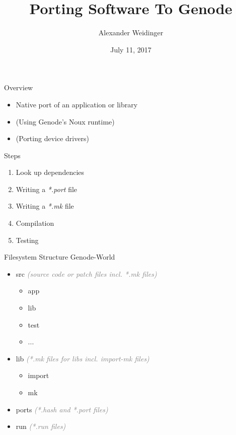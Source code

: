 \documentclass{beamer}
\title{Porting Software To Genode}
\date{July 11, 2017}
\author{Alexander Weidinger}
\institute{Technische Universität München}
\begin{document}
  \maketitle

  \begin{frame}{Overview}
    \begin{itemize}
      \item Native port of an application or library
      \item (Using Genode's Noux runtime)
      \item (Porting device drivers)
    \end{itemize}
  \end{frame}

  \begin{frame}{Steps}
    \begin{enumerate}
      \item Look up dependencies
      \item Writing a \textit{*.port} file
      \item Writing a \textit{*.mk} file
      \item Compilation
      \item Testing
    \end{enumerate}
  \end{frame}

  \begin{frame}{Filesystem Structure Genode-World}
    \begin{itemize}
      \item src \textcolor{gray}{\textit{(source code or patch files incl. *.mk files)}}
      \begin{itemize}
        \item app
        \item lib
        \item test
        \item ...
      \end{itemize}
      \item lib \textcolor{gray}{\textit{(*.mk files for libs incl. import-mk files)}}
      \begin{itemize}
        \item import
        \item mk
      \end{itemize}
      \item ports \textcolor{gray}{\textit{(*.hash and *.port files)}}
      \item run \textcolor{gray}{\textit{(*.run files)}}
    \end{itemize}
  \end{frame}
\end{document}
